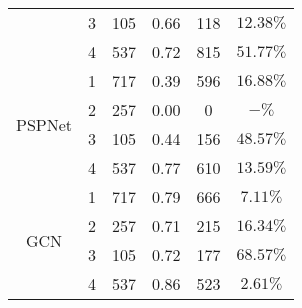 \begin{table}[ht!]
\begin{tabular}{cccccc}
		& 3 & 105 & \multicolumn{1}{c}{0.66} & \multicolumn{1}{c}{118} & \(12.38\%\) \\ 
		& 4 & 537 & \multicolumn{1}{c}{0.72} & \multicolumn{1}{c}{815} & \(51.77\%\) \\ 
		\midrule
		\multirow{4}{*}{PSPNet} 
		& 1 & 717 & \multicolumn{1}{c}{0.39} & \multicolumn{1}{c}{596} & \(16.88\%\) \\ 
		& 2 & 257 & \multicolumn{1}{c}{0.00} & \multicolumn{1}{c}{0} & \(-\%\) \\ 
		& 3 & 105 & \multicolumn{1}{c}{0.44} & \multicolumn{1}{c}{156} & \(48.57\%\) \\ 
		& 4 & 537 & \multicolumn{1}{c}{0.77} & \multicolumn{1}{c}{610} & \(13.59\%\) \\ 
		\midrule
		\multirow{4}{*}{GCN} 
		& 1 & 717 & \multicolumn{1}{c}{0.79} & \multicolumn{1}{c}{666} & \(7.11\%\) \\ 
		& 2 & 257 & \multicolumn{1}{c}{0.71} & \multicolumn{1}{c}{215} & \(16.34\%\) \\ 
		& 3 & 105 & \multicolumn{1}{c}{0.72} & \multicolumn{1}{c}{177} & \(68.57\%\) \\ 
		& 4 & 537 & \multicolumn{1}{c}{0.86} & \multicolumn{1}{c}{523} & \(2.61\%\) \\ 
		\bottomrule[1.5pt]
	\end{tabular}	
\end{table}

